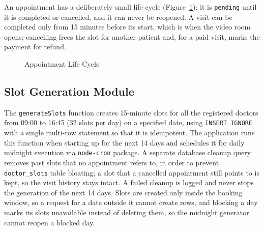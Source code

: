 An appointment has a deliberately small life cycle (Figure~\ref{fig:apptstates}): it is \texttt{pending} until it is completed or cancelled, and it can never be reopened. A visit can be completed only from 15 minutes before its start, which is when the video room opens; cancelling frees the slot for another patient and, for a paid visit, marks the payment for refund.

\begin{figure}[H]
\centering
{}
\caption{Appointment Life Cycle}
\label{fig:apptstates}
\end{figure}

\subsection{Slot Generation Module}

The \texttt{generateSlots} function creates 15-minute slots for all the registered doctors from 09:00 to 16:45 (32 slots per day) on a specified date, using \texttt{INSERT IGNORE} with a single multi-row statement so that it is idempotent. The application runs this function when starting up for the next 14 days and schedules it for daily midnight execution via \texttt{node-cron} package. A separate database cleanup query removes past slots that no appointment refers to, in order to prevent \texttt{doctor\_slots} table bloating; a slot that a cancelled appointment still points to is kept, so the visit history stays intact. A failed cleanup is logged and never stops the generation of the next 14 days. Slots are created only inside the booking window, so a request for a date outside it cannot create rows, and blocking a day marks its slots unavailable instead of deleting them, so the midnight generator cannot reopen a blocked day.

